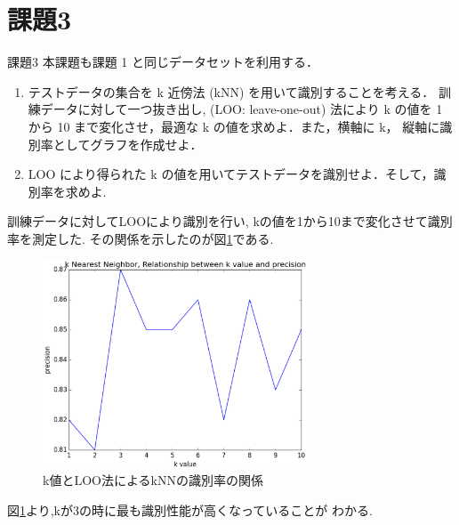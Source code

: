 \section{課題3}
\begin{itembox}{課題3}
  本課題も課題 1 と同じデータセットを利用する．
  \begin{enumerate}
    \item テストデータの集合を k 近傍法 (kNN) を用いて識別することを考える． 訓練データに対して一つ抜き出し, (LOO: leave-one-out) 法により k の値を 1 から 10 まで変化させ，最適な k の値を求めよ．また，横軸に k， 縦軸に識別率としてグラフを作成せよ．
    \item LOO により得られた k の値を用いてテストデータを識別せよ．そして，識別率を求めよ.
  \end{enumerate}
\end{itembox}
訓練データに対してLOOにより識別を行い, kの値を1から10まで変化させて識別率を測定した. 
その関係を示したのが図\ref{fig:kadai3}である. 
\begin{figure}[htbp]
  \centering
  \includegraphics[width=0.7\textwidth]{./assets/kadai3_various_kvalue_20150121_231435.eps}
  \caption{k値とLOO法によるkNNの識別率の関係}
  \label{fig:kadai3}
\end{figure}
図\ref{fig:kadai3}より,kが3の時に最も識別性能が高くなっていることが
わかる.


